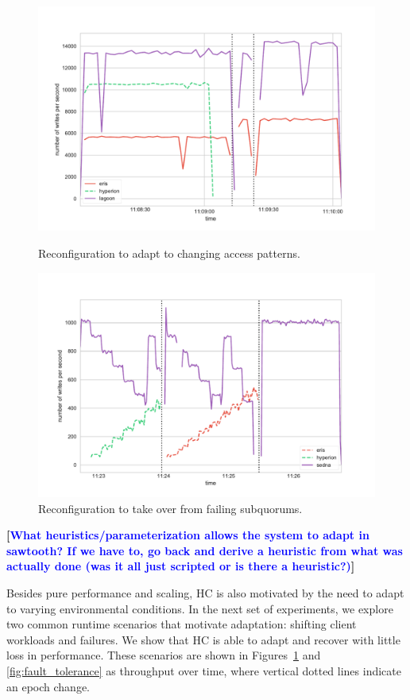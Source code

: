 \documentclass[10pt,conference]{IEEEtran}
\renewcommand{\pjk}[1]{{\bf
    [\marginpar[\hbox{{\textcolor{blue}{pjk}}\raisebox{0ex}{\Huge $\rightarrow$}}]%
{\hbox{\raisebox{0ex}{\Huge $\leftarrow$}{\textcolor{blue}{pjk}}}}\textcolor{blue}{#1}]}}
\begin{document}
\begin{figure}[t]
    \centering
        \includegraphics[width=\linewidth]{figures/umd_fault_tolerance.pdf}
        \caption{Reconfiguration to adapt to changing access patterns.}
        \label{fig:fault_tolerance}
    \endminipage\hfill
        \includegraphics[width=\linewidth]{figures/umd_sawtooth.pdf}
        \caption{Reconfiguration to take over from failing subquorums.}
        \label{fig:sawtooth}
    \endminipage
\end{figure}

          \pjk{What heuristics/parameterization allows the system to
            adapt in sawtooth? If we have to, go back and derive a
            heuristic from what was actually done (was it all just
            scripted or is there a heuristic?)}

Besides pure performance and scaling, HC is also motivated by the need to adapt to
varying environmental conditions.
In the next set of experiments, we explore two common runtime scenarios that motivate
adaptation: shifting client workloads and failures.
We show that HC is able to adapt and recover with little loss in performance. These
scenarios are shown in Figures~\ref{fig:sawtooth} and
\ref{fig:fault_tolerance} as throughput over time, where vertical dotted
lines indicate an epoch change.
\end{document}
